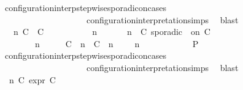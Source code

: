 \begin{isabellebody}
\ configuration{\isacharunderscore}interp{\isacharunderscore}stepwise{\isacharunderscore}sporadicon{\isacharunderscore}cases\isanewline
\ \ \ \ \ \ \ \ \ \ \ \ \ \ \ \ \ \ \ \ configuration{\isacharunderscore}interpretation{\isachardot}simps\ \isamarkupfalse%
\ blast\isanewline
\ \ \ \ \isamarkupfalse%
\isanewline
\ \ \ \ \ \ \isamarkupfalse%
\ \ {\isasymGamma}\ n\ C\ {\isasymtau}\ C\ {\isasymPsi}\ {\isasymPhi}\isanewline
\ \ \ \ \ \ \isamarkupfalse%
\ {\isacartoucheopen}{\isacharparenleft}{\isasymGamma}\ n\ {\isasymturnstile}\ {\isasymPsi}\ {\isasymtriangleright}\ {\isasymPhi}\ {\isacharequal}\ {\isacharparenleft}{\isasymGamma}{\isacharcomma}\ n\ {\isasymturnstile}\ {\isacharparenleft}C\ sporadic\ {\isasymtau}\ on\ C\ {\isacharhash}\ {\isasymPsi}\ {\isasymtriangleright}\ {\isasymPhi}{\isacharparenright}{\isacartoucheclose}\isanewline
\ \ \ \ \ \ \ {\isacartoucheopen}{\isacharparenleft}{\isasymGamma}\ n\ {\isasymturnstile}\ {\isasymPsi}\ {\isasymtriangleright}\ {\isasymPhi}\ {\isacharequal}\ {\isacharparenleft}{\isacharparenleft}{\isacharparenleft}C\ {\isasymUp}\ n{\isacharparenright}\ {\isacharhash}\ {\isacharparenleft}C\ {\isasymDown}\ n\ {\isacharat}\ {\isasymtau}{\isacharparenright}\ {\isacharhash}\ {\isasymGamma}{\isacharparenright}{\isacharcomma}\ n\ {\isasymturnstile}\ {\isasymPsi}\ {\isasymtriangleright}\ {\isasymPhi}{\isacharparenright}{\isacartoucheclose}\isanewline
\ \ \ \ \ \ \isamarkupfalse%
\ {\isacharquery}P\ \isamarkupfalse%
\ configuration{\isacharunderscore}interp{\isacharunderscore}stepwise{\isacharunderscore}sporadicon{\isacharunderscore}cases\isanewline
\ \ \ \ \ \ \ \ \ \ \ \ \ \ \ \ \ \ \ \ configuration{\isacharunderscore}interpretation{\isachardot}simps\ \isamarkupfalse%
\ blast\isanewline
\ \ \ \ \isamarkupfalse%
\isanewline
\ \ \ \ \ \ \isamarkupfalse%
\ {\isasymGamma}\ n\ C\ {\isasymtau}\isactrlsub e\isactrlsub x\isactrlsub p\isactrlsub r\ C\ {\isasymPsi}\ {\isasymPhi}\isanewline

\end{isabellebody}
